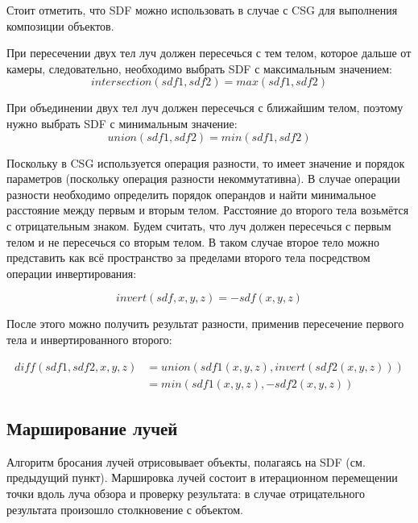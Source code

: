 Стоит  отметить,  что  SDF  можно  использовать  в  случае  с  CSG  для 
выполнения композиции объектов.

При пересечении двух тел луч должен пересечься с тем телом, которое 
дальше от камеры, следовательно, необходимо выбрать SDF с максимальным 
значением:
\begin{equation}
	intersection(sdf1, sdf2) = max(sdf1, sdf2)
	\label{eq:intersection}
\end{equation}

При объединении двух тел луч должен пересечься с ближайшим телом, 
поэтому нужно выбрать SDF с минимальным значение:
\begin{equation}
	union(sdf1, sdf2) = min(sdf1, sdf2)
	\label{eq:union}
\end{equation}

Поскольку в CSG используется операция разности, то имеет  значение и 
порядок параметров (поскольку операция разности некоммутативна).
В случае операции  разности  необходимо  определить  порядок  операндов  и  найти минимальное расстояние между первым и вторым телом.
Расстояние до второго тела  возьмётся  с  отрицательным  знаком.
Будем  считать,  что  луч  должен пересечься с первым телом и не пересечься со вторым телом.
В таком случае второе тело можно представить как всё пространство за пределами второго тела 
посредством операции инвертирования:

\begin{equation}
	invert(sdf, x, y, z) = -sdf(x, y, z)
	\label{eq:invert}
\end{equation}

После этого можно получить результат разности, применив пересечение 
первого тела и инвертированного второго:

\begin{equation}
	\begin{split}
	diff(sdf1, sdf2, x, y, z) &= union(sdf1(x, y, z), invert(sdf2(x, y, z))) \\
	&= min(sdf1(x, y, z), -sdf2(x, y, z))
	\label{eq:diff}
	\end{split}
\end{equation}

\subsection{Марширование лучей}

Алгоритм бросания лучей отрисовывает объекты, полагаясь на SDF (см. 
предыдущий пункт). 
Маршировка лучей состоит в итерационном перемещении точки  вдоль  луча  обзора  и  проверку  результата:  в  случае  отрицательного 
результата произошло столкновение с объектом.

